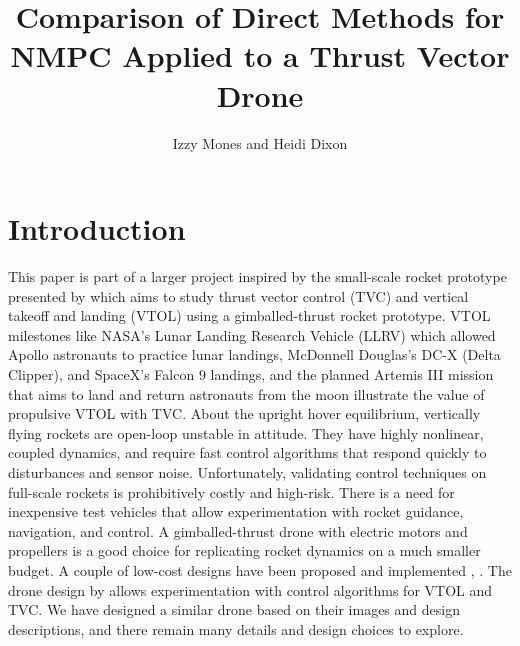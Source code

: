 \documentclass[]{article}
\title{Comparison of Direct Methods for NMPC Applied to a Thrust Vector Drone}
\author{Izzy Mones and Heidi Dixon}
\begin{document}
\maketitle
	
\section*{Introduction}	
	This paper is part of a larger project inspired by the small-scale rocket prototype presented by \cite{TVCDrone} which aims to study thrust vector control (TVC) and vertical takeoff and landing (VTOL) using a gimballed-thrust rocket prototype. 
	VTOL milestones like NASA's Lunar Landing Research Vehicle (LLRV) which allowed Apollo astronauts to practice lunar landings, McDonnell Douglas’s DC-X (Delta Clipper), and SpaceX's Falcon 9 landings, and the planned Artemis III mission that aims to land and return astronauts from the moon illustrate the value of propulsive VTOL with TVC. 	
	About the upright hover equilibrium, vertically flying rockets are open-loop unstable in attitude. They have highly nonlinear, coupled dynamics, and require fast control algorithms that respond quickly to disturbances and sensor noise. Unfortunately, validating control techniques on full-scale rockets is prohibitively costly and high-risk. There is a need for inexpensive test vehicles that allow experimentation with rocket guidance, navigation, and control. 
	A gimballed-thrust drone with electric motors and propellers is a good choice for replicating rocket dynamics on a much smaller budget. A couple of low-cost designs have been proposed and implemented  \citep{cheapTVC}, \citep{TVCDrone}. The drone design by \cite{TVCDrone} allows experimentation with control algorithms for VTOL and TVC. We have designed a similar drone based on their images and design descriptions, and there remain many details and design choices to explore.
\end{document}
